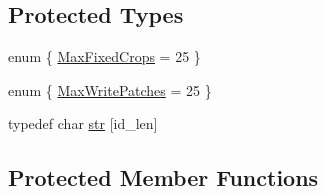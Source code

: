 \subsection*{Protected Types}
\begin{DoxyCompactItemize}
\item 
enum \{ \hyperlink{classfield_ac9700210a8ba81db46722b7ee572a673ae55908c767f059fc8071dd960b9b63c9}{MaxFixedCrops} = 25
 \}
\item 
enum \{ \hyperlink{classfield_a1b15dba3f966736e40276ac6026f76e9a72cd17de1f06f30df4f9cd0efa5bcd0c}{MaxWritePatches} = 25
 \}
\item 
typedef char \hyperlink{classfield_a6f1744c3ac290d5fc0ef66302c0ec632}{str} \mbox{[}id\_\-len\mbox{]}
\end{DoxyCompactItemize}
\subsection*{Protected Member Functions}
